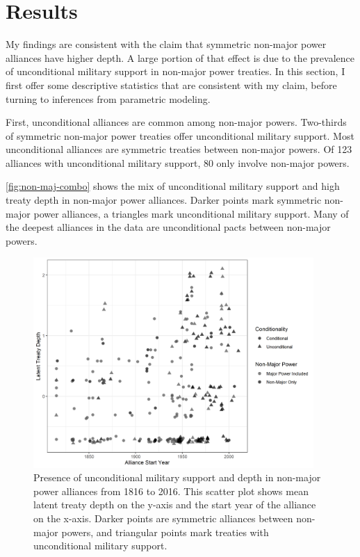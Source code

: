 \documentclass[12pt]{article}
\begin{document}
\section{Results}


My findings are consistent with the claim that symmetric non-major power alliances have higher depth. 
A large portion of that effect is due to the prevalence of unconditional military support in non-major power treaties. 
In this section, I first offer some descriptive statistics that are consistent with my claim, before turning to inferences from parametric modeling. 


First, unconditional alliances are common among non-major powers. 
Two-thirds of symmetric non-major power treaties offer unconditional military support. 
Most unconditional alliances are symmetric treaties between non-major powers. 
Of 123 alliances with unconditional military support, 80 only involve non-major powers. 


\autoref{fig:non-maj-combo} shows the mix of unconditional military support and high treaty depth in non-major power alliances. 
Darker points mark symmetric non-major power alliances, a triangles mark unconditional military support. 
Many of the deepest alliances in the data are unconditional pacts between non-major powers. 


\begin{figure}[hbtp]
\centering
\includegraphics[width=0.95\textwidth]{../figures/non-maj-combo.png}
\caption{Presence of unconditional military support and depth in non-major power alliances from 1816 to 2016. This scatter plot shows mean latent treaty depth on the y-axis and the start year of the alliance on the x-axis. Darker points are symmetric alliances between non-major powers, and triangular points mark treaties with unconditional military support.}
\label{fig:non-maj-combo}
\end{figure}
\end{document}
